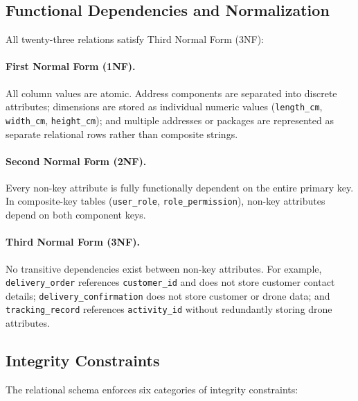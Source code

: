 \subsection{Functional Dependencies and Normalization}

All twenty-three relations satisfy Third Normal Form (3NF):

\paragraph{First Normal Form (1NF).}
All column values are atomic. Address components are separated into discrete attributes; dimensions are stored as individual numeric values (\texttt{length\_cm}, \texttt{width\_cm}, \texttt{height\_cm}); and multiple addresses or packages are represented as separate relational rows rather than composite strings.

\paragraph{Second Normal Form (2NF).}
Every non-key attribute is fully functionally dependent on the entire primary key. In composite-key tables (\texttt{user\_role}, \texttt{role\_permission}), non-key attributes depend on both component keys.

\paragraph{Third Normal Form (3NF).}
No transitive dependencies exist between non-key attributes. For example, \texttt{delivery\_order} references \texttt{customer\_id} and does not store customer contact details; \texttt{delivery\_confirmation} does not store customer or drone data; and \texttt{tracking\_record} references \texttt{activity\_id} without redundantly storing drone attributes.

\subsection{Integrity Constraints}

The relational schema enforces six categories of integrity constraints:

